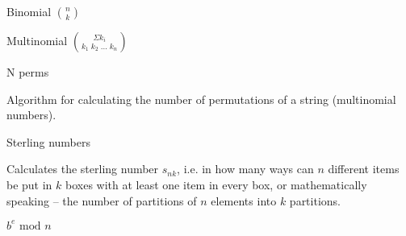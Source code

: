 

\begin{algorithm}{Binomial $\binom{n}{k}$}
\end{algorithm}

\begin{algorithm}{Multinomial $\binom{\Sigma k_i}{k_1\;k_2\;\ldots\;k_n}$}
\end{algorithm}

\begin{algorithm}{N perms}

Algorithm for calculating the number of permutations of a string
(multinomial numbers).
\end{algorithm}

\begin{algorithm}{Sterling numbers}

Calculates the sterling number $s_{nk}$, i.e. in how many ways can $n$
different items be put in $k$ boxes with at least one item in every box, or
mathematically speaking -- the number of partitions of $n$ elements into
$k$ partitions.
\end{algorithm}

\begin{algorithm}{$b^e \textrm{ mod } n$}
\end{algorithm}
